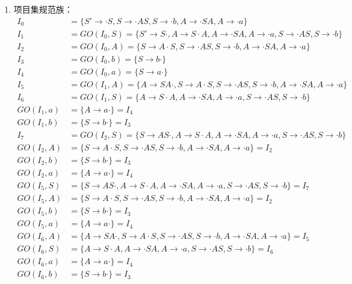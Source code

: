 \begin{enumerate}
	\item 项目集规范族：
	\begin{align*}
		I_{0} &= \{S' \to \cdot S, S \to \cdot AS, S \to \cdot b, A \to \cdot SA, A \to \cdot a\} \\	
		I_{1} &= GO(I_{0}, S) = \{S' \to S \cdot, A \to S \cdot A, A \to \cdot SA, A \to \cdot a, S \to \cdot AS, S \to \cdot b\} \\
		I_{2} &= GO(I_{0}, A) = \{S \to A \cdot S, S \to \cdot AS, S \to \cdot b, A \to \cdot SA, A \to \cdot a\} \\
		I_{3} &= GO(I_{0}, b) = \{S \to b \cdot\} \\
		I_{4} &= GO(I_{0}, a) = \{S \to a \cdot\} \\
		I_{5} &= GO(I_{1}, A) = \{A \to SA \cdot, S \to A \cdot S, S \to \cdot AS, S \to \cdot b, A \to \cdot SA, A \to \cdot a\} \\	
		I_{6} &= GO(I_{1}, S) = \{A \to S \cdot A, A \to \cdot SA, A \to \cdot a, S \to \cdot AS, S \to \cdot b\} \\	
		GO(I_{1}, a)&= \{A \to a \cdot\} = I_{4} \\	
		GO(I_{1}, b)&= \{S \to b \cdot\} = I_{3}\\
		I_{7} &= GO(I_{2}, S) = \{S \to AS \cdot, A \to S \cdot A, A \to \cdot SA, A \to \cdot a, S \to \cdot AS, S \to \cdot b\} \\
		GO(I_{2}, A)&= \{S \to A \cdot S, S \to \cdot AS, S \to \cdot b, A \to \cdot SA, A \to \cdot a\} = I_{2} \\
		GO(I_{2}, b)&= \{S \to b \cdot\}=I_{3} \\
		GO(I_{2}, a)&= \{A \to a \cdot\}=I_{4} \\
		GO(I_{5}, S)&= \{S \to AS \cdot, A \to S \cdot A, A \to \cdot SA, A \to \cdot a, S \to \cdot AS, S \to \cdot b\}=I_{7} \\
		GO(I_{5}, A)&= \{S \to A \cdot S, S \to \cdot AS, S \to \cdot b, A \to \cdot SA, A \to \cdot a\}=I_{2} \\
		GO(I_{5}, b)&= \{S \to b \cdot\}=I_{3} \\
		GO(I_{5}, a)&= \{A \to a \cdot\}=I_{4} \\
		GO(I_{6}, A)&= \{A \to SA \cdot, S \to A \cdot S, S \to \cdot AS, S \to \cdot b, A \to \cdot SA, A \to \cdot a\}=I_{5} \\
		GO(I_{6}, S)&= \{A \to S \cdot A, A \to \cdot SA, A \to \cdot a, S \to \cdot AS, S \to \cdot b\}=I_{6} \\
		GO(I_{6}, a)&= \{A \to a \cdot\}=I_{4} \\
		GO(I_{6}, b)&= \{S \to b \cdot\}=I_{3} \\

\end{align*}
\end{enumerate}
